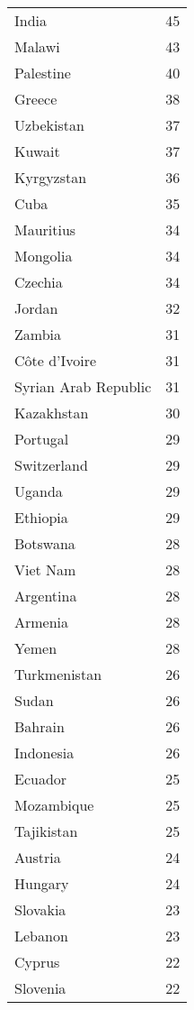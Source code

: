 {\begin{table}[ht!]
\begin{minipage}[t]{0.50\textwidth}
\begin{tabular}{lr}
            India & 45 \\
            Malawi & 43 \\
            Palestine & 40 \\
            Greece & 38 \\
            Uzbekistan & 37 \\
            Kuwait & 37 \\
            Kyrgyzstan & 36 \\
            Cuba & 35 \\
            Mauritius & 34 \\
            Mongolia & 34 \\
            Czechia & 34 \\
            Jordan & 32 \\
            Zambia & 31 \\
            Côte d'Ivoire & 31 \\
            Syrian Arab Republic & 31 \\
            Kazakhstan & 30 \\
            Portugal & 29 \\
            Switzerland & 29 \\
            Uganda & 29 \\
            Ethiopia & 29 \\
            Botswana & 28 \\
            Viet Nam & 28 \\
            Argentina & 28 \\
            Armenia & 28 \\
            Yemen & 28 \\
            Turkmenistan & 26 \\
            Sudan & 26 \\
            Bahrain & 26 \\
            Indonesia & 26 \\
            Ecuador & 25 \\
            Mozambique & 25 \\
            Tajikistan & 25 \\
            Austria & 24 \\
            Hungary & 24 \\
            Slovakia & 23 \\
            Lebanon & 23 \\
            Cyprus & 22 \\
            Slovenia & 22 \\

\end{tabular}
\end{minipage}
\end{table}}
